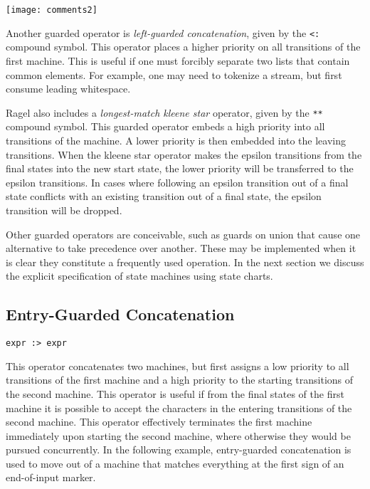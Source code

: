 \documentclass[letterpaper,11pt,oneside]{book}
\newcommand{\verbspace}{\vspace{10pt}}
\newcommand{\graphspace}{\vspace{10pt}}
\begin{document}
\graphspace
\begin{center}
\texttt{[image: comments2]}
\end{center}
\graphspace

Another guarded operator is {\em left-guarded concatenation}, given by the
\verb|<:| compound symbol. This operator places a higher priority on all
transitions of the first machine. This is useful if one must forcibly separate
two lists that contain common elements. For example, one may need to tokenize a
stream, but first consume leading whitespace.

Ragel also includes a {\em longest-match kleene star} operator, given by the
\verb|**| compound symbol. This 
guarded operator embeds a high
priority into all transitions of the machine. 
A lower priority is then embedded into the leaving transitions.  When the
kleene star operator makes the epsilon transitions from
the final states into the new start state, the lower priority will be transferred
to the epsilon transitions. In cases where following an epsilon transition
out of a final state conflicts with an existing transition out of a final
state, the epsilon transition will be dropped.

Other guarded operators are conceivable, such as guards on union that cause one
alternative to take precedence over another. These may be implemented when it
is clear they constitute a frequently used operation.
In the next section we discuss the explicit specification of state machines
using state charts.

\subsection{Entry-Guarded Concatenation}

\verb|expr :> expr| 
\verbspace

This operator concatenates two machines, but first assigns a low
priority to all transitions
of the first machine and a high priority to the starting transitions of the
second machine. This operator is useful if from the final states of the first
machine it is possible to accept the characters in the entering transitions of
the second machine. This operator effectively terminates the first machine
immediately upon starting the second machine, where otherwise they would be
pursued concurrently. In the following example, entry-guarded concatenation is
used to move out of a machine that matches everything at the first sign of an
end-of-input marker.
\end{document}
